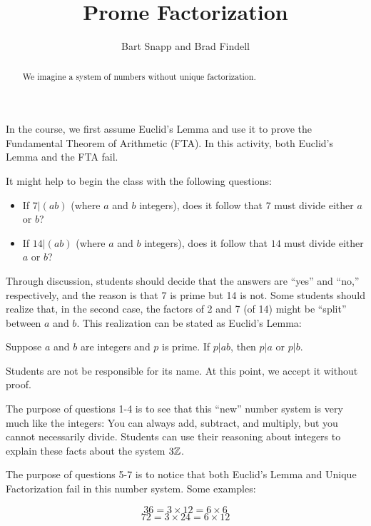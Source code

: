 \documentclass[nooutcomes]{ximera}
\title{Prome Factorization}
\author{Bart Snapp and Brad Findell}
\begin{document}
\begin{abstract}
  We imagine a system of numbers without unique factorization.
\end{abstract}
\maketitle

\label{A:Prome}

\begin{teachingnote}
In the course, we first assume Euclid's Lemma and use it to prove the Fundamental Theorem of Arithmetic (FTA).  In this activity, both Euclid's Lemma and the FTA fail.

It might help to begin the class with the following questions:  
\begin{itemize}
\item If $7|(ab)$ (where $a$ and $b$ integers), does it follow that $7$ must divide either $a$ or $b$? 
\item If $14|(ab)$ (where $a$ and $b$ integers), does it follow that $14$ must divide either $a$ or $b$? 
\end{itemize}

Through discussion, students should decide that the answers are ``yes'' and ``no,'' respectively, and the reason is that 7 is prime but 14 is not.  Some students should realize that, in the second case, the factors of 2 and 7 (of 14) might be ``split'' between $a$ and $b$.  This realization can be stated as Euclid's Lemma:  

\begin{center}
Suppose $a$ and $b$ are integers and $p$ is prime.  If $p|ab$, then $p|a$ or $p|b$.  
\end{center}

Students are not be responsible for its name.  At this point, we accept it without proof.  

The purpose of questions 1-4 is to see that this ``new'' number system is very much like the integers:  You can always add, subtract, and multiply, but you cannot necessarily divide.  Students can use their reasoning about integers to explain these facts about the system $3\mathbb Z$.  

The purpose of questions 5-7 is to notice that both Euclid's Lemma and Unique Factorization fail in this number system.  Some examples:  

$$36 = 3\times 12 = 6\times 6$$
$$72 = 3\times 24=6\times 12$$
\end{teachingnote}
\end{document}
